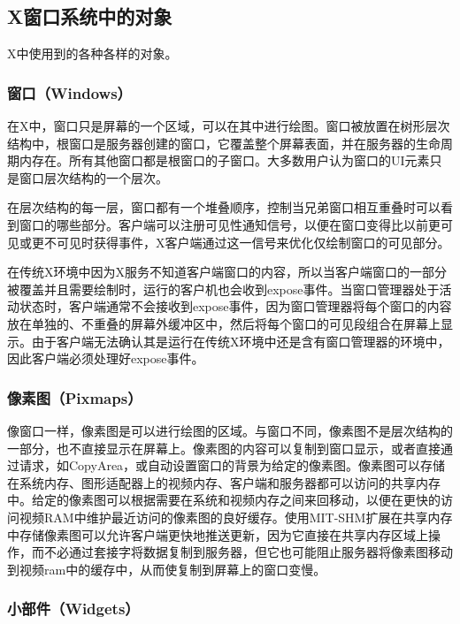 \subsection{X窗口系统中的对象}

X中使用到的各种各样的对象。


\subsubsection{窗口（Windows）}

在X中，窗口只是屏幕的一个区域，可以在其中进行绘图。窗口被放置在树形层次结构中，根窗口是服务器创建的窗口，它覆盖整个屏幕表面，并在服务器的生命周期内存在。所有其他窗口都是根窗口的子窗口。大多数用户认为窗口的UI元素只是窗口层次结构的一个层次。

在层次结构的每一层，窗口都有一个堆叠顺序，控制当兄弟窗口相互重叠时可以看到窗口的哪些部分。客户端可以注册可见性通知信号，以便在窗口变得比以前更可见或更不可见时获得事件，X客户端通过这一信号来优化仅绘制窗口的可见部分。

在传统X环境中因为X服务不知道客户端窗口的内容，所以当客户端窗口的一部分被覆盖并且需要绘制时，运行的客户机也会收到expose事件。当窗口管理器处于活动状态时，客户端通常不会接收到expose事件，因为窗口管理器将每个窗口的内容放在单独的、不重叠的屏幕外缓冲区中，然后将每个窗口的可见段组合在屏幕上显示。由于客户端无法确认其是运行在传统X环境中还是含有窗口管理器的环境中，因此客户端必须处理好expose事件。

\subsubsection{像素图（Pixmaps）}

像窗口一样，像素图是可以进行绘图的区域。与窗口不同，像素图不是层次结构的一部分，也不直接显示在屏幕上。像素图的内容可以复制到窗口显示，或者直接通过请求，如CopyArea，或自动设置窗口的背景为给定的像素图。像素图可以存储在系统内存、图形适配器上的视频内存、客户端和服务器都可以访问的共享内存中。给定的像素图可以根据需要在系统和视频内存之间来回移动，以便在更快的访问视频RAM中维护最近访问的像素图的良好缓存。使用MIT-SHM扩展在共享内存中存储像素图可以允许客户端更快地推送更新，因为它直接在共享内存区域上操作，而不必通过套接字将数据复制到服务器，但它也可能阻止服务器将像素图移动到视频ram中的缓存中，从而使复制到屏幕上的窗口变慢。

\subsubsection{小部件（Widgets）}

